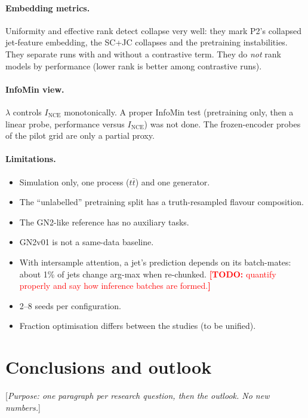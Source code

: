 \documentclass[11pt,a4paper]{article}
\newcommand{\todo}[1]{\textcolor{red}{\textbf{[TODO:} #1\textbf{]}}}
\newcommand{\note}[1]{\textcolor{blue!70!black}{[\emph{#1}]}}
\newcommand{\ttbar}{\ensuremath{t\bar{t}}}
\begin{document}
\paragraph{Embedding metrics.}
Uniformity and effective rank detect collapse very well: they mark P2's collapsed
jet-feature embedding, the SC+JC collapses and the pretraining instabilities. They separate runs with
and without a contrastive term. They do \emph{not} rank models by performance (lower rank
is better among contrastive runs).

\paragraph{InfoMin view.}
$\lambda$ controls $I_{\mathrm{NCE}}$ monotonically. A proper InfoMin test (pretraining only,
then a linear probe, performance versus $I_{\mathrm{NCE}}$) was not done. The
frozen-encoder probes of the pilot grid are only a partial proxy.

\paragraph{Limitations.}
\begin{itemize}
  \item Simulation only, one process (\ttbar) and one generator.
  \item The ``unlabelled'' pretraining split has a truth-resampled flavour composition.
  \item The GN2-like reference has no auxiliary tasks.
  \item GN2v01 is not a same-data baseline.
  \item With intersample attention, a jet's prediction depends on its batch-mates: about
        1\% of jets change arg-max when re-chunked. \todo{quantify properly and say how
        inference batches are formed.}
  \item 2--8 seeds per configuration.
  \item Fraction optimisation differs between the studies (to be unified).
\end{itemize}

\section{Conclusions and outlook}
\label{sec:conclusions}

\note{Purpose: one paragraph per research question, then the outlook. No new numbers.}
\end{document}
